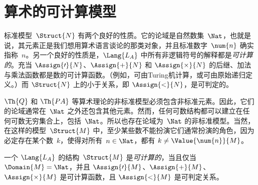 \documentclass[../../../include/open-logic-section]{subfiles}
\begin{document}
\section{算术的可计算模型}

\begin{explain}
标准模型~$\Struct{N}$ 有两个良好的性质。它的论域是自然数集~$\Nat$，也就是说，其元素正是我们想用算术语言谈论的那类对象，并且标准数字~$\num{n}$ 确实指称~$n$。另一个良好的性质是，$\Lang{L_A}$ 中所有非逻辑符号的解释都是\emph{可计算的}。充当 $\Assign{\prime}{N}$、$\Assign{+}{N}$ 和 $\Assign{\times}{N}$ 的后继、加法与乘法函数都是数的可计算函数。（例如，可由Turing机计算，或可由原始递归定义。）而 $\Struct{N}$ 上的小于关系，即 $\Assign{<}{N}$，是可判定的。

$\Th{Q}$ 和 $\Th{PA}$ 等算术理论的非标准模型必须包含非标准元素。因此，它们的论域通常在~$\Nat$ 之外还包含其他元素。然而，任何可数结构都可以建立在任何可数无穷集合上，包括~$\Nat$。所以也存在论域为~$\Nat$ 的非标准模型。当然，在这样的模型~$\Struct{M}$ 中，至少某些数不能扮演它们通常扮演的角色，因为必定存在某个数~$k$，使得对所有~$n \in \Nat$，都有 $k \neq \Value{\num{n}}{M}$。
\end{explain}

\begin{defn}
一个 $\Lang{L_A}$ 的结构~$\Struct{M}$ 是\emph{可计算的}，当且仅当 $\Domain{M} = \Nat$，并且 $\Assign{\prime}{M}$、$\Assign{+}{M}$、$\Assign{\times}{M}$ 是可计算函数，且 $\Assign{<}{M}$ 是可判定关系。
\end{defn}
\end{document}
